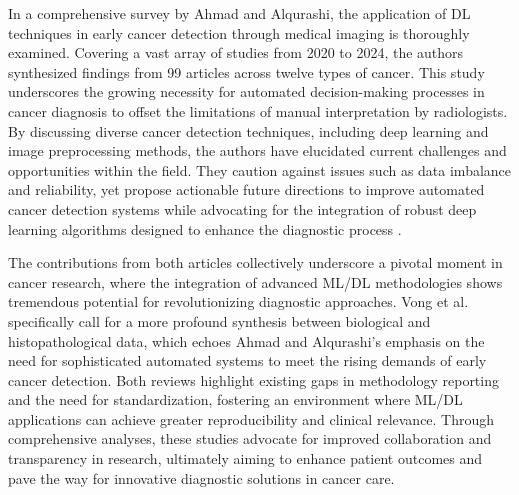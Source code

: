 \documentclass[runningheads]{llncs}
\begin{document}
In a comprehensive survey by Ahmad and Alqurashi, the application of DL techniques in early cancer detection through medical imaging is thoroughly examined. Covering a vast array of studies from 2020 to 2024, the authors synthesized findings from 99 articles across twelve types of cancer. This study underscores the growing necessity for automated decision-making processes in cancer diagnosis to offset the limitations of manual interpretation by radiologists. By discussing diverse cancer detection techniques, including deep learning and image preprocessing methods, the authors have elucidated current challenges and opportunities within the field. They caution against issues such as data imbalance and reliability, yet propose actionable future directions to improve automated cancer detection systems while advocating for the integration of robust deep learning algorithms designed to enhance the diagnostic process \cite{Istiak_2024}.

The contributions from both articles collectively underscore a pivotal moment in cancer research, where the integration of advanced ML/DL methodologies shows tremendous potential for revolutionizing diagnostic approaches. Vong et al. specifically call for a more profound synthesis between biological and histopathological data, which echoes Ahmad and Alqurashi's emphasis on the need for sophisticated automated systems to meet the rising demands of early cancer detection. Both reviews highlight existing gaps in methodology reporting and the need for standardization, fostering an environment where ML/DL applications can achieve greater reproducibility and clinical relevance. Through comprehensive analyses, these studies advocate for improved collaboration and transparency in research, ultimately aiming to enhance patient outcomes and pave the way for innovative diagnostic solutions in cancer care.
\end{document}
